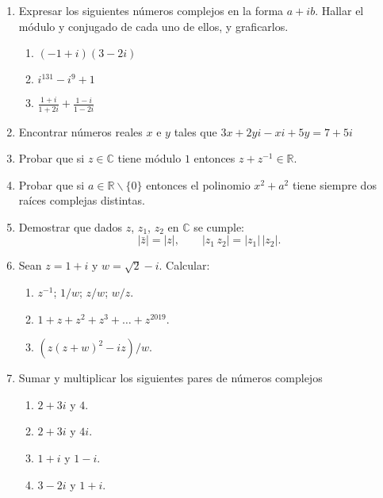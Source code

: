 \documentclass[a4paper,12pt,twoside,spanish,reqno]{amsbook}
\numberwithin{equation}{section}
\newcommand \C{{\mathbb C}}
\begin{document}
\begin{enumerate}[topsep=6pt, itemsep=.4cm]

\item Expresar los siguientes números complejos en la forma $a +i b$.
Hallar el módulo y conjugado de cada uno de ellos, y graficarlos.
\begin{multicols}{3}
\begin{enumerate}
\item $(-1+i) (3-2i)$
\item $i^{131} - i^9 +1$
\item $\frac {1+i}{1+2i} + \frac{1-i}{1-2i}$
\end{enumerate}
\end{multicols}



\item Encontrar números reales $x$ e $y$ tales que $3x+2yi-xi+5y = 7 + 5i$


\item Probar que si $z \in \mathbb{C}$ tiene módulo $1$ entonces $z + z^{-1} \in \mathbb{R}.$

\item Probar que si $a\in \mathbb{R}\backslash \{0\}$ entonces el polinomio $x^2+a^2$ tiene siempre dos raíces complejas distintas.


\item Demostrar que  dados $z$, $z_1$, $z_2$ en $\C$ se cumple:
\[ |\bar z|= |z|, \qquad |z_1 \, z_2|= |z_1| \, |z_2|. \]



\item Sean $z=1+i$ y $w=\sqrt{2}-i$. Calcular:
\begin{enumerate}
    \item $z^{-1}$; $1/w$; $z/w$; $w/z$.
    \item $1+z+z^2+z^3+\dots+z^{2019}$.
    \item $(z(z+w)^2-iz)/w$.
\end{enumerate}

\item Sumar y multiplicar los siguientes pares de números complejos
    \begin{enumerate}
        \item $2+ 3i$ y $4$.
        \item $2+ 3i$ y $4i$.
        \item $1 + i$ y $ 1 -i$.
        \item $3-2i$ y $1 +i$. 
    \end{enumerate}



\end{enumerate}
\end{document}
